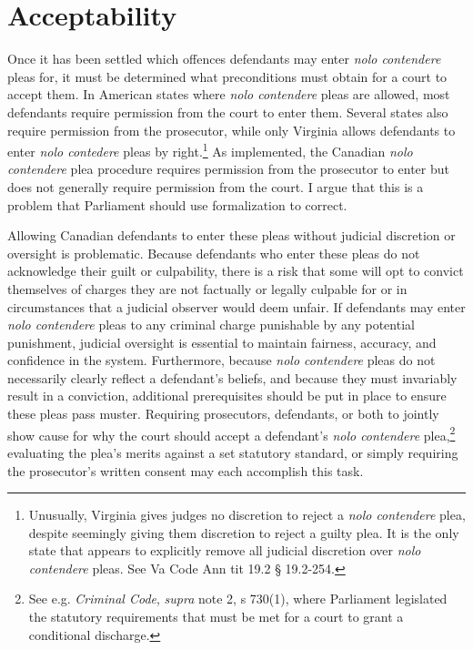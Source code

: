 \section{Acceptability}

Once it has been settled which offences defendants may enter \textit{nolo contendere} pleas for, it must be determined what preconditions must obtain for a court to accept them. In American states where \textit{nolo contendere} pleas are allowed, most defendants require permission from the court to enter them. Several states also require permission from the prosecutor, while only Virginia allows defendants to enter \textit{nolo contedere} pleas by right.\footnote{Unusually, Virginia gives judges no discretion to reject a \textit{nolo contendere} plea, despite seemingly giving them discretion to reject a guilty plea. It is the only state that appears to explicitly remove all judicial discretion over \textit{nolo contendere} pleas. See Va Code Ann tit 19.2 § 19.2-254.} As implemented, the Canadian \textit{nolo contendere} plea procedure requires permission from the prosecutor to enter but does not generally require permission from the court. I argue that this is a problem that Parliament should use formalization to correct.

Allowing Canadian defendants to enter these pleas without judicial discretion or oversight is problematic. Because defendants who enter these pleas do not acknowledge their guilt or culpability, there is a risk that some will opt to convict themselves of charges they are not factually or legally culpable for or in circumstances that a judicial observer would deem unfair. If defendants may enter \textit{nolo contendere} pleas to any criminal charge punishable by any potential punishment, judicial oversight is essential to maintain fairness, accuracy, and confidence in the system. Furthermore, because \textit{nolo contendere} pleas do not necessarily clearly reflect a defendant's beliefs, and because they must invariably result in a conviction, additional prerequisites should be put in place to ensure these pleas pass muster. Requiring prosecutors, defendants, or both to jointly show cause for why the court should accept a defendant's \textit{nolo contendere} plea,\footnote{See e.g. \textit{Criminal Code}, \textit{supra} note 2, s 730(1), where Parliament legislated the statutory requirements that must be met for a court to grant a conditional discharge.} evaluating the plea's merits against a set statutory standard, or simply requiring the prosecutor's written consent may each accomplish this task. 

